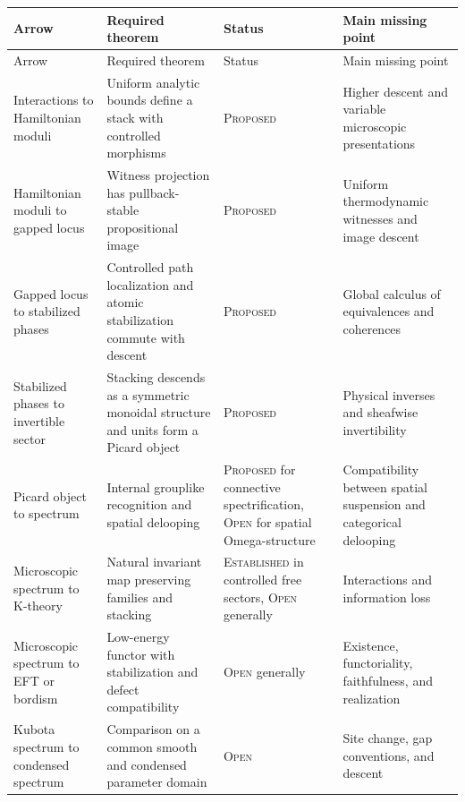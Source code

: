 \documentclass[12pt]{article}
\theoremstyle{definition}
\theoremstyle{remark}
\newcommand{\EST}{\textnormal{\textsc{Established}}}
\newcommand{\PROP}{\textnormal{\textsc{Proposed}}}
\newcommand{\OPEN}{\textnormal{\textsc{Open}}}
\begin{document}
\begin{longtable}{>{\raggedright\arraybackslash}p{}
                  >{\raggedright\arraybackslash}p{}
                  >{\raggedright\arraybackslash}p{}
                  >{\raggedright\arraybackslash}p{}}
\toprule
Arrow & Required theorem & Status & Main missing point \\
\midrule
\endfirsthead
\toprule
Arrow & Required theorem & Status & Main missing point \\
\midrule
\endhead
Interactions to Hamiltonian moduli
& Uniform analytic bounds define a stack with controlled morphisms
& \PROP{}
& Higher descent and variable microscopic presentations \\

Hamiltonian moduli to gapped locus
& Witness projection has pullback-stable propositional image
& \PROP{}
& Uniform thermodynamic witnesses and image descent \\

Gapped locus to stabilized phases
& Controlled path localization and atomic stabilization commute with descent
& \PROP{}
& Global calculus of equivalences and coherences \\

Stabilized phases to invertible sector
& Stacking descends as a symmetric monoidal structure and units form a Picard object
& \PROP{}
& Physical inverses and sheafwise invertibility \\

Picard object to spectrum
& Internal grouplike recognition and spatial delooping
& \PROP{} for connective spectrification, \OPEN{} for spatial Omega-structure
& Compatibility between spatial suspension and categorical delooping \\

Microscopic spectrum to K-theory
& Natural invariant map preserving families and stacking
& \EST{} in controlled free sectors, \OPEN{} generally
& Interactions and information loss \\

Microscopic spectrum to EFT or bordism
& Low-energy functor with stabilization and defect compatibility
& \OPEN{} generally
& Existence, functoriality, faithfulness, and realization \\

Kubota spectrum to condensed spectrum
& Comparison on a common smooth and condensed parameter domain
& \OPEN{}
& Site change, gap conventions, and descent \\
\bottomrule
\end{longtable}
\end{document}
